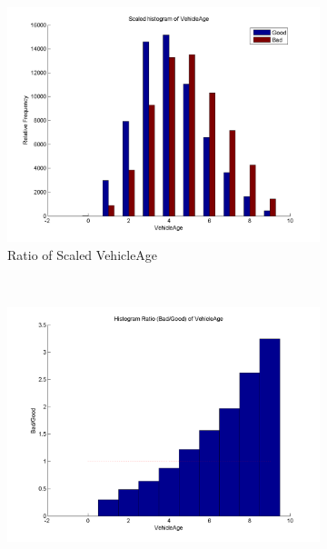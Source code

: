 \documentclass[paper=letter, fontsize=11pt]{scrartcl} %
\numberwithin{equation}{section} %
\begin{document}
\begin{figure}[!ht]
        \centering
        \begin{subfigure}[b]{0.3\textwidth}
                \centering
                \includegraphics[width=\textwidth]{figures/HistogramScaled_VehicleAge.png}
                \caption{Ratio of Scaled VehicleAge}
                \label{fig:Scaled_VehicleAge}
        \end{subfigure}%
        ~ %
        \begin{subfigure}[b]{0.3\textwidth}
                \centering
                \includegraphics[width=\textwidth]{figures/HistogramRatio_VehicleAge.png}

\end{subfigure}
\end{figure}
\end{document}

